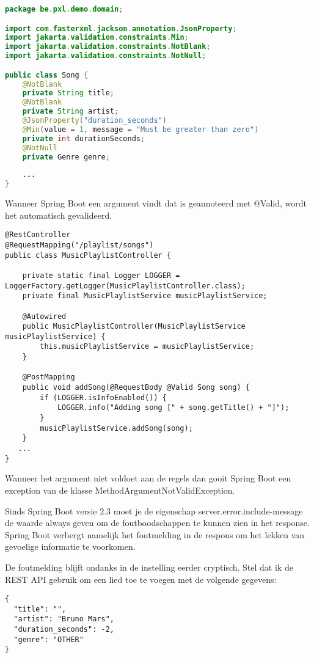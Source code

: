 \begin{lstlisting}[language=java, frame=single]
package be.pxl.demo.domain;

import com.fasterxml.jackson.annotation.JsonProperty;
import jakarta.validation.constraints.Min;
import jakarta.validation.constraints.NotBlank;
import jakarta.validation.constraints.NotNull;

public class Song {
	@NotBlank
	private String title;
	@NotBlank
	private String artist;
	@JsonProperty("duration_seconds")
	@Min(value = 1, message = "Must be greater than zero")
	private int durationSeconds;
	@NotNull
	private Genre genre;
	
	...
}
\end{lstlisting}

Wanneer Spring Boot een argument vindt dat is geannoteerd met @Valid,  wordt het automatisch gevalideerd.

\begin{lstlisting}
@RestController
@RequestMapping("/playlist/songs")
public class MusicPlaylistController {

	private static final Logger LOGGER = LoggerFactory.getLogger(MusicPlaylistController.class);
	private final MusicPlaylistService musicPlaylistService;

	@Autowired
	public MusicPlaylistController(MusicPlaylistService musicPlaylistService) {
		this.musicPlaylistService = musicPlaylistService;
	}

	@PostMapping
	public void addSong(@RequestBody @Valid Song song) {
		if (LOGGER.isInfoEnabled()) {
			LOGGER.info("Adding song [" + song.getTitle() + "]");
		}
		musicPlaylistService.addSong(song);
	}
   ...
}
\end{lstlisting}

Wanneer het argument niet voldoet aan de regels dan gooit Spring Boot een exception van de klasse MethodArgumentNotValidException.

Sinds Spring Boot versie 2.3 moet je de eigenschap server.error.include-message de waarde always geven om de foutboodschappen te kunnen zien in het response. Spring Boot verbergt namelijk het foutmelding in de respons om het lekken van gevoelige informatie te voorkomen. 

De foutmelding blijft ondanks in de instelling eerder cryptisch.  Stel dat ik de REST API gebruik om een lied toe te voegen met de volgende gegevens:

\begin{verbatim}
{
  "title": "",
  "artist": "Bruno Mars",
  "duration_seconds": -2,
  "genre": "OTHER"
}
\end{verbatim}

